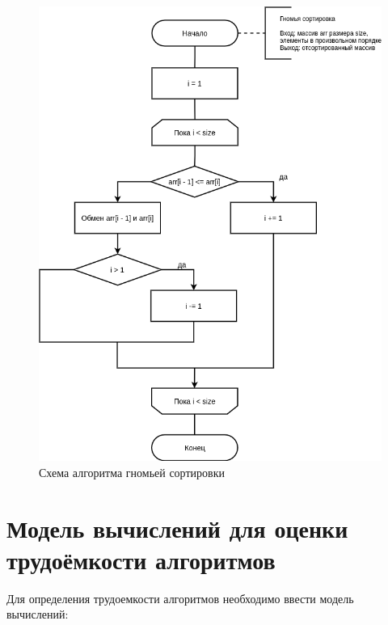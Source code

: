 \begin{figure}[H]
	\begin{center}
		\includegraphics[scale=0.5]{img/gnome_sort.png}
	\end{center}
	\captionsetup{justification=centering}
	\caption{Схема алгоритма гномьей сортировки}
	\label{img:gnome_sort}
\end{figure}

\section{Модель вычислений для оценки трудоёмкости алгоритмов}

Для определения трудоемкости алгоритмов необходимо ввести модель вычислений:

